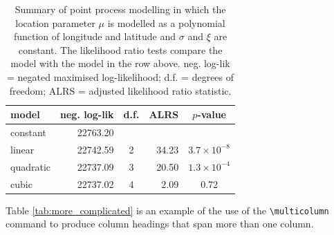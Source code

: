 \documentclass[a4paper,12pt,titlepage]{article} %
\numberwithin{equation}{section}  %
\begin{document}
\renewcommand{\arraystretch}{1.1} %
\begin{table}[h]                  %
\centering
\begin{tabular}{lrcrc}            %
\\ \hline                         %
model   &  neg. log-lik & d.f. & ALRS        & $p$-value \\ \hline           %
constant &  22763.20    &       &                &   \\                      %
linear     &  22742.59    &  2   & 34.23       & $3.7 \times 10^{-8}$ \\     %
quadratic & 22737.09     &  3   & 20.50       & $1.3 \times 10^{-4}$ \\
cubic       & 22737.02     &  4   & 2.09         & 0.72 \\ \hline
\end{tabular}                     %
\caption{Summary of point process modelling in which the location parameter $\mu$ is modelled as a polynomial function of longitude and latitude and $\sigma$ and $\xi$ are constant.  The likelihood ratio tests compare the model with the model in the row above. neg. log-lik = negated maximised log-likelihood; d.f. = degrees of freedom; ALRS = adjusted likelihood ratio statistic.}
\label{tab:simple}
\end{table}
\renewcommand{\arraystretch}{1}  %

Table \ref{tab:more_complicated} is an example of the use of the \verb!\multicolumn! command to produce column headings that span more than one column.             %
\end{document}
